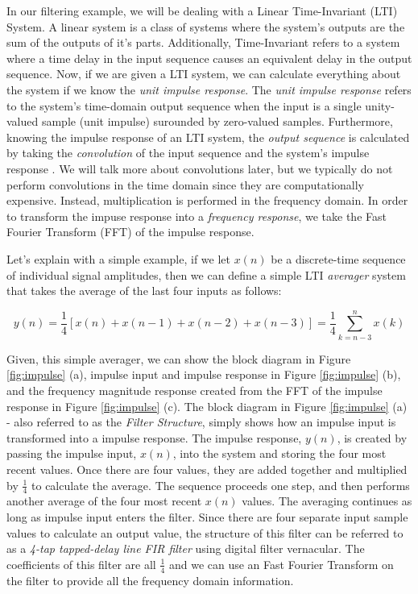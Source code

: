 	In our filtering example, we will be dealing with a Linear Time-Invariant (LTI) System.  A linear system is a class of systems where the system's outputs are the sum of the outputs of it's parts.  Additionally, Time-Invariant refers to a system where a time delay in the input sequence causes an equivalent delay in the output sequence.  Now, if we are given a LTI system, we can calculate everything about the system if we know the \textit{unit impulse response}.  The \textit{unit impulse response} refers to the system's time-domain output sequence when the input is a single unity-valued sample (unit impulse) surounded by zero-valued samples.  Furthermore, knowing the impulse response of an LTI system, the \textit{output sequence} is calculated by taking the \textit{convolution}  of the input sequence and the system's impulse response \cite{lyons:intro}.  We will talk more about convolutions later, but we typically do not perform convolutions in the time domain since they are computationally expensive.  Instead, multiplication is performed in the frequency domain.  In order to transform the impuse response into a \textit{frequency response}, we take the Fast Fourier Transform (FFT) of the impulse response\cite{lyons:intro}.

Let's explain with a simple example, if we let $x(n)$ be a discrete-time sequence of individual signal amplitudes, then we can define a simple LTI \textit{averager} system that takes the average of the last four inputs  as follows: 

$$y(n) = \frac{1}{4} \left[ x(n)+x(n-1)+x(n-2)+x(n-3)\right] =  \frac{1}{4}\sum_{k=n-3}^{n} x(k)$$    

Given, this simple averager, we can show the block diagram in Figure \ref{fig:impulse} (a), impulse input and impulse response in Figure \ref{fig:impulse} (b), and the frequency magnitude response created from the FFT of the impulse response in Figure \ref{fig:impulse} (c).  The block diagram in Figure \ref{fig:impulse} (a) - also referred to as the \textit{Filter Structure}, simply shows how an impulse input is transformed into a impulse response.  The impulse response, $y(n)$, is created by passing the impulse input, $x(n)$, into the system and storing the four most recent values.  Once there are four values, they are added together and multiplied by $\frac{1}{4}$ to calculate the average.  The sequence proceeds one step, and then performs another average of the four most recent $x(n)$ values.  The averaging continues as long as impulse input enters the filter.   Since there are four separate input sample values to calculate an output value, the structure of this filter can be referred to as a \textit{4-tap tapped-delay line FIR filter} using digital filter vernacular.  The coefficients of this filter are all $\frac{1}{4}$ and we can use an Fast Fourier Transform on the filter to provide all the frequency domain information.

